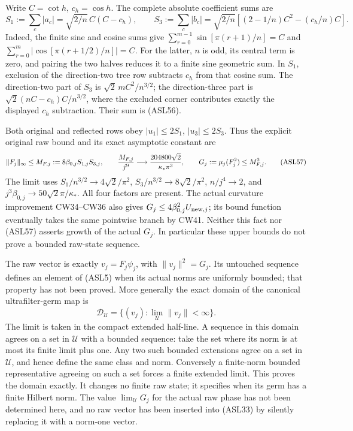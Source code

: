 \documentclass[11pt]{article}
\begin{document}
Write \(C=\cot h\), \(c_h=\cos h\). The complete absolute coefficient sums are
\[
 S_1:=\sum_c|a_c|=\sqrt{2/n}\,C(C-c_h),\qquad
 S_3:=\sum_c|b_c|=\sqrt{2/n}\left[(2-1/n)C^2-(c_h/n)C\right].
 \tag{ASL56}
\]
Indeed, the finite sine and cosine sums give \(\sum_{r=0}^{m-1}\sin[\pi(r+1)/n]=C\) and \(\sum_{r=0}^{m}|\cos[\pi(r+1/2)/n]|=C\). For the latter, \(n\) is odd, its central term is zero, and pairing the two halves reduces it to a finite sine geometric sum. In \(S_1\), exclusion of the direction-two tree row subtracts \(c_h\) from that cosine sum. The direction-two part of \(S_3\) is \(\sqrt2\,mC^2/n^{3/2}\); the direction-three part is \(\sqrt2(nC-c_h)C/n^{3/2}\), where the excluded corner contributes exactly the displayed \(c_h\) subtraction. Their sum is (ASL56).

Both original and reflected rows obey \(|u_1|\le2S_1\), \(|u_3|\le2S_3\). Thus the explicit original raw bound and its exact asymptotic constant are
\[
 \|F_j\|_\infty\le M_{F,j}:=8\beta_{0,j}S_{1,j}S_{3,j},\qquad
 {M_{F,j}\over j^9}\longrightarrow{204800\sqrt2\over\kappa_*\pi^3},\qquad
 G_j:=\mu_j(F_j^2)\le M_{F,j}^2.
 \tag{ASL57}
\]
The limit uses \(S_1/n^{3/2}\to4\sqrt2/\pi^2\), \(S_3/n^{3/2}\to8\sqrt2/\pi^2\), \(n/j^4\to2\), and \(j^3\beta_{0,j}\to50\sqrt2\pi/\kappa_*\). All four factors are present. The actual curvature improvement CW34–CW36 also gives \(G_j\le4\beta_{0,j}^2U_{{\rm new},j}\); its bound function eventually takes the same pointwise branch by CW41. Neither this fact nor (ASL57) asserts growth of the actual \(G_j\). In particular these upper bounds do not prove a bounded raw-state sequence.

The raw vector is exactly \(v_j=F_j\psi_j\), with \(\|v_j\|^2=G_j\). Its untouched sequence defines an element of (ASL5) when its actual norms are uniformly bounded; that property has not been proved. More generally the exact domain of the canonical ultrafilter-germ map is
\[
 \mathcal D_{\mathcal U}=\{(v_j):\lim_{\mathcal U}\|v_j\|<\infty\}.
 \tag{ASL58}
\]
The limit is taken in the compact extended half-line. A sequence in this domain agrees on a set in \(\mathcal U\) with a bounded sequence: take the set where its norm is at most its finite limit plus one. Any two such bounded extensions agree on a set in \(\mathcal U\), and hence define the same class and norm. Conversely a finite-norm bounded representative agreeing on such a set forces a finite extended limit. This proves the domain exactly. It changes no finite raw state; it specifies when its germ has a finite Hilbert norm. The value \(\lim_{\mathcal U}G_j\) for the actual raw phase has not been determined here, and no raw vector has been inserted into (ASL33) by silently replacing it with a norm-one vector.
\end{document}
